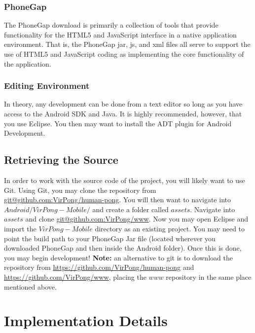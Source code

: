 \documentclass[12pt]{article}
\begin{document}
\subsubsection{PhoneGap}
The PhoneGap download is primarily a collection of tools that provide functionality for the HTML5 and JavaScript interface in a native application environment.  That is, the PhoneGap jar, js, and xml files all serve to support the use of HTML5 and JavaScript coding as implementing the core functionality of the application.   

\subsubsection{Editing Environment}
In theory, any development can be done from a text editor so long as you have access to the Android SDK and Java.  It is highly recommended, however, that you use Eclipse\cite{Eclipse-Helios}.  You then may want to install the ADT plugin for Android Development\cite{Eclipse-ADT}.

\subsection{Retrieving the Source}
In order to work with the source code of the project, you will likely want to use Git\cite{Github}.  Using Git, you may clone the repository from \url{git@github.com:VirPong/human-pong}.  You will then want to navigate into $Android/VirPong-Mobile/$ and create a folder called $assets$.  Navigate into $assets$ and clone \url{git@github.com:VirPong/www}.  Now you may open Eclipse and import the $VirPong-Mobile$ directory as an existing project.  You may need to point the build path to your PhoneGap Jar file (located wherever you downloaded PhoneGap and then inside the Android folder).  Once this is done, you may begin development!  \textbf{Note:} an alternative to git is to download the repository from \url{https://github.com/VirPong/human-pong} and \url{https://github.com/VirPong/www}, placing the $www$ repository in the same place mentioned above.



\section{Implementation Details}
\end{document}
